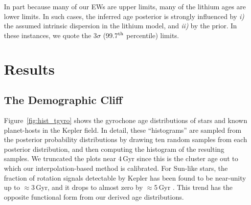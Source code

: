\documentclass[11pt,twocolumn,tighten]{aastex63}
\begin{document}
In part because many of our EWs are upper limits, many of the lithium
ages are lower limits.  In such cases,  the inferred age posterior is
strongly influenced by {\it i)} the assumed intrinsic dispersion in
the lithium model, and {\it ii)} by the prior.  In these instances, we
quote the 3$\sigma$ (99.7$^{\rm th}$ percentile) limits.


\section{Results}
\label{sec:results}

\begin{figure*}[!t]
  \begin{center}
    \leavevmode

	\vspace{-0.35cm}
  \end{center}
  \vspace{-0.6cm}
  \caption{{\bf Kepler's demographic cliff,} visible in the
  rotation-derived ages of stars (left) and planet hosts (middle) in
  the Kepler field.  The top row corresponds to all stars with
  temperatures of 3800--6200\,K for which we calculated rotation-based
  ages.  The darker lines impose quality cuts on factors such as
  binarity, crowding, and the star's evolutionary state.  The bottom
  row selects only stars with temperatures of 4400-5400\,K, which have
  relatively precise ages near 2\,Gyr due to their fast spin-down
  \citep[see][]{Bouma_2023}.  The statistical uncertainty for a mean
  individual star at 1, 2, and 3\,Gyr is shown, and is identical
  across each row.  Finally, the right panel compares the
  rotation-based age distributions against star formation histories
  derived using CMD fitting.  Completeness is near unity until
  $t$$\lesssim$3\,Gyr \citep{2022ApJ...937...94M}.
  \label{fig:hist_tgyro}
  }
\end{figure*}


\subsection{The Demographic Cliff}

Figure~\ref{fig:hist_tgyro} shows the gyrochone age distributions of
stars and known planet-hosts in the Kepler field.  In detail, these
``histograms'' are sampled from the posterior probability
distributions by drawing ten random samples from each posterior
distribution, and then computing the histogram of the resulting
samples.  We truncated the plots near $4$\,Gyr since this is the
cluster age out to which our interpolation-based method is calibrated.
For Sun-like stars, the fraction of rotation signals detectable by
Kepler has been found to be near-unity up to $\approx$3\,Gyr, and it
drops to almost zero by $\approx$5\,Gyr \citep{2022ApJ...937...94M}.
This trend has the opposite functional form from our derived age
distributions.
\end{document}
